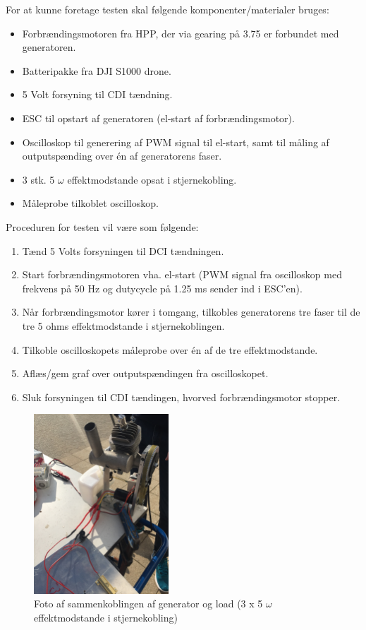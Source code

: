 For at kunne foretage testen skal følgende komponenter/materialer bruges:
\begin{itemize}
\item Forbrændingsmotoren fra HPP, der via gearing på 3.75 er forbundet med generatoren.
\item Batteripakke fra DJI S1000 drone.
\item 5 Volt forsyning til CDI tændning.
\item ESC til opstart af generatoren (el-start af forbrændingsmotor).
\item Oscilloskop til generering af PWM signal til el-start, samt til måling af outputspænding over én af generatorens faser.
\item 3 stk. 5 $\omega$ effektmodstande opsat i stjernekobling.
\item Måleprobe tilkoblet oscilloskop.
\end{itemize}

Proceduren for testen vil være som følgende:

\begin{enumerate}
\item Tænd 5 Volts forsyningen til DCI tændningen.
\item Start forbrændingsmotoren vha. el-start (PWM signal fra oscilloskop med frekvens på 50 Hz og dutycycle på 1.25 ms sender ind i ESC’en).
\item Når forbrændingsmotor kører i tomgang, tilkobles generatorens tre faser til de tre 5 ohms effektmodstande i stjernekoblingen.
\item Tilkoble oscilloskopets måleprobe over én af de tre effektmodstande.
\item Aflæs/gem graf over outputspændingen fra oscilloskopet.
\item Sluk forsyningen til CDI tændingen, hvorved forbrændingsmotor stopper.
\end{enumerate}

\begin{figure}[h]
  \centering
  \includegraphics[width=0.45\textwidth]{testsetup2.JPG}
  \caption{Foto af sammenkoblingen af generator og load (3 x 5 $\omega$ effektmodstande i stjernekobling)}
  \label{fig:testsetup2}
\end{figure}

